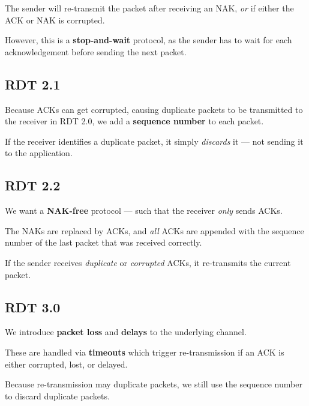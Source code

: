 The sender will re-transmit the packet after receiving an NAK, \textit{or} if either
the ACK or NAK is corrupted.

However, this is a \textbf{stop-and-wait} protocol, as the sender has to wait for each acknowledgement
before sending the next packet.

\subsection{RDT 2.1}
Because ACKs can get corrupted, causing duplicate packets to be transmitted to the receiver in RDT 2.0,
we add a \textbf{sequence number} to each packet.

If the receiver identifies a duplicate packet, it simply \textit{discards} it --- not sending it
to the application.

\subsection{RDT 2.2}
We want a \textbf{NAK-free} protocol --- such that the receiver \textit{only} sends ACKs.

The NAKs are replaced by ACKs, and \textit{all} ACKs are appended with the sequence number of the last
packet that was received correctly.

If the sender receives \textit{duplicate} or \textit{corrupted} ACKs, it re-transmits the current packet.

\subsection{RDT 3.0}
We introduce \textbf{packet loss} and \textbf{delays} to the underlying channel.

These are handled via \textbf{timeouts} which trigger re-transmission if an ACK is either
corrupted, lost, or delayed.

Because re-transmission may duplicate packets, we still use the sequence number to
discard duplicate packets.